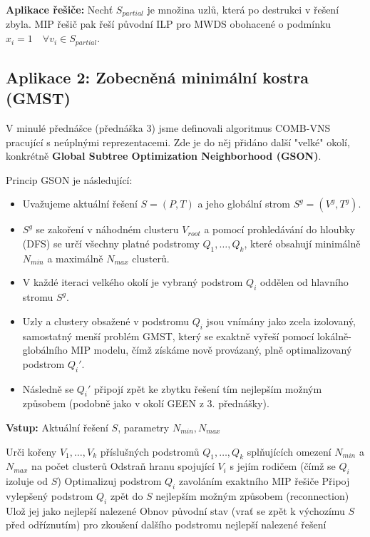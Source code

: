 \documentclass[12pt,a4paper]{article}
\theoremstyle{definition}
\begin{document}
\textbf{Aplikace řešiče:} Nechť $S_{partial}$ je množina uzlů, která po destrukci v řešení zbyla. MIP řešič pak řeší původní ILP pro MWDS obohacené o podmínku $x_i = 1 \quad \forall v_i \in S_{partial}$.

\subsection{Aplikace 2: Zobecněná minimální kostra (GMST)}

V minulé přednášce (přednáška 3) jsme definovali algoritmus COMB-VNS pracující s neúplnými reprezentacemi. Zde je do něj přidáno další "velké" okolí, konkrétně \textbf{Global Subtree Optimization Neighborhood (GSON)}. 

Princip GSON je následující:
\begin{itemize}
    \item Uvažujeme aktuální řešení $S=(P,T)$ a jeho globální strom $S^g = (V^g, T^g)$.
    \item $S^g$ se zakoření v náhodném clusteru $V_{root}$ a pomocí prohledávání do hloubky (DFS) se určí všechny platné podstromy $Q_1, \dots, Q_k$, které obsahují minimálně $N_{min}$ a maximálně $N_{max}$ clusterů.
    \item V každé iteraci velkého okolí je vybraný podstrom $Q_i$ oddělen od hlavního stromu $S^g$. 
    \item Uzly a clustery obsažené v podstromu $Q_i$ jsou vnímány jako zcela izolovaný, samostatný menší problém GMST, který se exaktně vyřeší pomocí lokálně-globálního MIP modelu, čímž získáme nově provázaný, plně optimalizovaný podstrom $Q_i'$.
    \item Následně se $Q_i'$ připojí zpět ke zbytku řešení tím nejlepším možným způsobem (podobně jako v okolí GEEN z 3. přednášky).
\end{itemize}

\begin{algorithm}[H]
\caption{Exploration of GSON}
\textbf{Vstup:} Aktuální řešení $S$, parametry $N_{min}, N_{max}$
\begin{algorithmic}[1]
\STATE Urči kořeny $V_1, \dots, V_k$ příslušných podstromů $Q_1, \dots, Q_k$ splňujících omezení $N_{min}$ a $N_{max}$ na počet clusterů
    \STATE Odstraň hranu spojující $V_i$ s jejím rodičem (čímž se $Q_i$ izoluje od $S$)
    \STATE Optimalizuj podstrom $Q_i$ zavoláním exaktního MIP řešiče
    \STATE Připoj vylepšený podstrom $Q_i$ zpět do $S$ nejlepším možným způsobem (reconnection)
        \STATE Ulož jej jako nejlepší nalezené
    \ENDIF
    \STATE Obnov původní stav (vrať se zpět k výchozímu $S$ před odříznutím) pro zkoušení dalšího podstromu
\ENDFOR
\RETURN nejlepší nalezené řešení
\end{algorithmic}
\end{algorithm}
\end{document}
